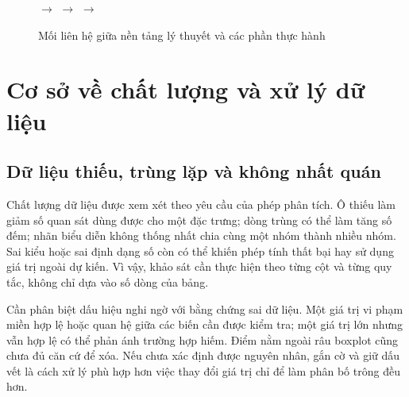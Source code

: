 \begin{figure}[htbp]
  \centering
  \begingroup
  \footnotesize
  \setlength{\fboxsep}{4pt}
  \hfill $\longrightarrow$ \hfill
  \hfill $\longrightarrow$ \hfill
  \hfill $\longrightarrow$ \hfill
  \endgroup
  \caption{Mối liên hệ giữa nền tảng lý thuyết và các phần thực hành}
  \label{fig:machtrinhbay}
\end{figure}

\section{Cơ sở về chất lượng và xử lý dữ liệu}
\label{sec:chatluongdulieu}

\subsection{Dữ liệu thiếu, trùng lặp và không nhất quán}

Chất lượng dữ liệu được xem xét theo yêu cầu của phép phân tích. Ô thiếu làm giảm số quan sát dùng được cho một đặc trưng; dòng trùng có thể làm tăng số đếm; nhãn biểu diễn không thống nhất chia cùng một nhóm thành nhiều nhóm. Sai kiểu hoặc sai định dạng số còn có thể khiến phép tính thất bại hay sử dụng giá trị ngoài dự kiến. Vì vậy, khảo sát cần thực hiện theo từng cột và từng quy tắc, không chỉ dựa vào số dòng của bảng.

Cần phân biệt dấu hiệu nghi ngờ với bằng chứng sai dữ liệu. Một giá trị vi phạm miền hợp lệ hoặc quan hệ giữa các biến cần được kiểm tra; một giá trị lớn nhưng vẫn hợp lệ có thể phản ánh trường hợp hiếm. Điểm nằm ngoài râu boxplot cũng chưa đủ căn cứ để xóa. Nếu chưa xác định được nguyên nhân, gắn cờ và giữ dấu vết là cách xử lý phù hợp hơn việc thay đổi giá trị chỉ để làm phân bố trông đều hơn.

